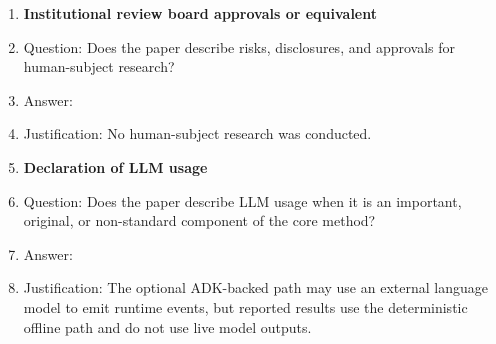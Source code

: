 \begin{enumerate}
\item {\bf Institutional review board approvals or equivalent}
\item[] Question: Does the paper describe risks, disclosures, and approvals for human-subject research?
\item[] Answer: \answerNA{}
\item[] Justification: No human-subject research was conducted.

\item {\bf Declaration of LLM usage}
\item[] Question: Does the paper describe LLM usage when it is an important, original, or non-standard component of the core method?
\item[] Answer: \answerYes{}
\item[] Justification: The optional ADK-backed path may use an external language model to emit runtime events, but reported results use the deterministic offline path and do not use live model outputs.

\end{enumerate}
